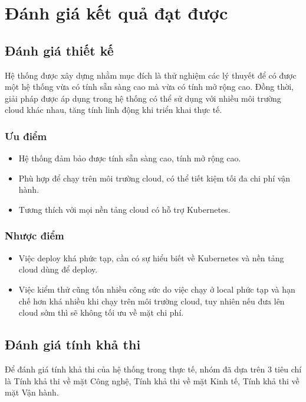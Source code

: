 \section{Đánh giá kết quả đạt được}
\subsection{Đánh giá thiết kế}
\noindent Hệ thống được xây dựng nhằm mục đích là thử nghiệm các lý thuyết để có được một hệ thống vừa có tính sẵn sàng cao mà vừa có tính mở rộng cao. Đồng thời, giải pháp được áp dụng trong hệ thống có thể sử dụng với nhiều môi trường cloud khác nhau, tăng tính linh động khi triển khai thực tế.
\subsubsection{Ưu điểm}
\begin{itemize}
    \item Hệ thống đảm bảo được tính sẵn sàng cao, tính mở rộng cao.
    \item Phù hợp để chạy trên môi trường cloud, có thể tiết kiệm tối đa chi phí vận hành.
    \item Tương thích với mọi nền tảng cloud có hỗ trợ Kubernetes.
\end{itemize}
\subsubsection{Nhược điểm}
\begin{itemize}
    \item Việc deploy khá phức tạp, cần có sự hiểu biết về Kubernetes và nền tảng cloud dùng để deploy.
    \item Việc kiểm thử cũng tốn nhiều công sức do việc chạy ở local phức tạp và hạn chế hơn khá nhiều khi chạy trên môi trường cloud, tuy nhiên nếu đưa lên cloud sớm thì sẽ không tối ưu về mặt chi phí.
\end{itemize}
\subsection{Đánh giá tính khả thi}
\noindent Để đánh giá tính khả thi của hệ thống trong thực tế, nhóm đã dựa trên 3 tiêu chí là Tính khả thi về mặt Công nghệ, Tính khả thi về mặt Kinh tế, Tính khả thi về mặt Vận hành.
